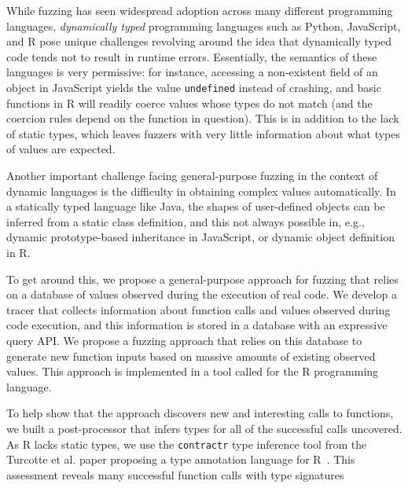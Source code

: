 \documentclass[sigplan,anonymous,review]{acmart}
\begin{document}
While fuzzing has seen widespread adoption across many different programming languages, \textit{dynamically typed} programming languages such as Python, JavaScript, and R pose unique challenges revolving around the idea that dynamically typed code tends not to result in runtime errors.
Essentially, the semantics of these languages is very permissive: for instance, accessing a non-existent field of an object in JavaScript yields the value {\tt undefined} instead of crashing, and basic functions in R will readily coerce values whose types do not match (and the coercion rules depend on the function in question).
This is in addition to the lack of static types, which leaves fuzzers with very little information about what types of values are expected.

Another important challenge facing general-purpose fuzzing in the context of dynamic languages is the difficulty in obtaining complex values automatically.
In a statically typed language like Java, the shapes of user-defined objects can be inferred from a static class definition, and this not always possible in, e.g., dynamic prototype-based inheritance in JavaScript, or dynamic object definition in R.

To get around this, we propose a general-purpose approach for fuzzing that relies on a database of values observed during the execution of real code.
We develop a tracer that collects information about function calls and values observed during code execution, and this information is stored in a database with an expressive query API.
We propose a fuzzing approach that relies on this database to generate new function inputs based on massive amounts of existing observed values.
This approach is implemented in a tool called \tool for the R programming language.

To help show that the approach discovers new and interesting calls to functions, we built a post-processor that infers types for all of the successful calls \tool uncovered.
As R lacks static types, we use the {\tt contractr} type inference tool from the Turcotte et al. paper proposing a type annotation language for R~\cite{turcotte2020designing}.
This assessment reveals many successful function calls with type signatures  
\end{document}
